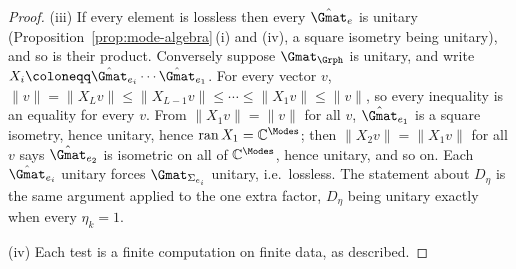 \begin{proof}
(iii) If every element is lossless then every $\hat\Gmat_e$ is unitary
(Proposition~\ref{prop:mode-algebra}\,(i) and (iv), a square isometry being
unitary), and so is their product. Conversely suppose $\Gmat_\Grph$ is unitary,
and write $X_i\coloneqq\hat\Gmat_{e_i}\cdots\hat\Gmat_{e_1}$. For every vector
$v$,
$\lVert v\rVert=\lVert X_Lv\rVert\le\lVert X_{L-1}v\rVert\le\cdots\le
\lVert X_1v\rVert\le\lVert v\rVert$, so every inequality is an equality for
every $v$. From $\lVert X_1v\rVert=\lVert v\rVert$ for all $v$, $\hat\Gmat_{e_1}$
is a square isometry, hence unitary, hence $\operatorname{ran}X_1=
\mathbb{C}^{\Modes}$; then $\lVert X_2v\rVert=\lVert X_1v\rVert$ for all $v$
says $\hat\Gmat_{e_2}$ is isometric on all of $\mathbb{C}^{\Modes}$, hence
unitary, and so on. Each $\hat\Gmat_{e_i}$ unitary forces
$\Gmat_{\Sigma_{e_i}}$ unitary, i.e.\ lossless. The statement about $D_\eta$ is
the same argument applied to the one extra factor, $D_\eta$ being unitary
exactly when every $\eta_k=1$.

(iv) Each test is a finite computation on finite data, as described.
\end{proof}
